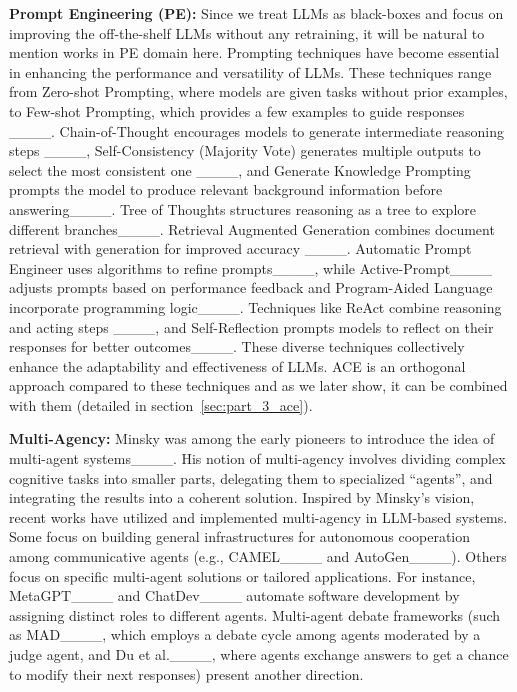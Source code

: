 \textbf{Prompt Engineering (PE):} 
Since we treat LLMs as black-boxes and focus on improving the off-the-shelf LLMs without any retraining, it will be natural to mention works in PE domain here. Prompting techniques have become essential in enhancing the performance and versatility of LLMs. These techniques range from Zero-shot Prompting, where models are given tasks without prior examples, to Few-shot Prompting, which provides a few examples to guide responses ____. Chain-of-Thought encourages models to generate intermediate reasoning steps ____,
Self-Consistency (Majority Vote) generates multiple outputs to select the most consistent one ____, and Generate Knowledge Prompting prompts the model to produce relevant background information before answering____. Tree of Thoughts structures reasoning as a tree to explore different branches____. Retrieval Augmented Generation combines document retrieval with generation for improved accuracy ____. Automatic Prompt Engineer uses algorithms to refine prompts____, while Active-Prompt____ adjusts prompts based on performance feedback and Program-Aided Language  incorporate programming logic____. Techniques like ReAct combine reasoning and acting steps ____, and Self-Reflection prompts models to reflect on their responses for better outcomes____.  These diverse techniques collectively enhance the adaptability and effectiveness of LLMs. ACE is an orthogonal approach compared to these techniques and as we later show, it can be combined with them (detailed in section~\ref{sec:part_3_ace}).

\textbf{Multi-Agency:} 
Minsky was among the early pioneers to introduce the idea of multi-agent systems____. His notion of multi-agency involves dividing complex cognitive tasks into smaller parts, delegating them to specialized “agents”, and integrating the results into a coherent solution. Inspired by Minsky’s vision, recent works have utilized and implemented multi-agency in LLM-based systems.
Some focus on building general infrastructures for autonomous cooperation among communicative agents (e.g., CAMEL____ and AutoGen____). Others focus on specific multi-agent solutions or tailored applications. For instance, MetaGPT____ and ChatDev____ automate software development by assigning distinct roles to different agents. Multi-agent debate frameworks (such as MAD____, which employs a debate cycle among agents moderated by a judge agent, and Du et al.____, where agents exchange answers to get a chance to modify their next responses) present another direction. 

